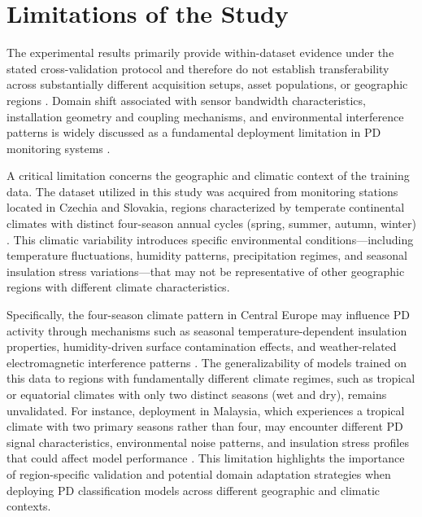 \section{Limitations of the Study}

The experimental results primarily provide within-dataset evidence under the stated cross-validation protocol and therefore do not establish transferability across substantially different acquisition setups, asset populations, or geographic regions \parencite{Raymond_2022, Seitz_2024_1}. Domain shift associated with sensor bandwidth characteristics, installation geometry and coupling mechanisms, and environmental interference patterns is widely discussed as a fundamental deployment limitation in PD monitoring systems \parencite{Friebe_2024, Sikorski_2025}.

A critical limitation concerns the geographic and climatic context of the training data. The dataset utilized in this study was acquired from monitoring stations located in Czechia and Slovakia, regions characterized by temperate continental climates with distinct four-season annual cycles (spring, summer, autumn, winter) \parencite{Florkowski_2024, Sikorski_2025}. This climatic variability introduces specific environmental conditions—including temperature fluctuations, humidity patterns, precipitation regimes, and seasonal insulation stress variations—that may not be representative of other geographic regions with different climate characteristics.

Specifically, the four-season climate pattern in Central Europe may influence PD activity through mechanisms such as seasonal temperature-dependent insulation properties, humidity-driven surface contamination effects, and weather-related electromagnetic interference patterns \parencite{Orellana_2023_1, Florkowski_2024}. The generalizability of models trained on this data to regions with fundamentally different climate regimes, such as tropical or equatorial climates with only two distinct seasons (wet and dry), remains unvalidated. For instance, deployment in Malaysia, which experiences a tropical climate with two primary seasons rather than four, may encounter different PD signal characteristics, environmental noise patterns, and insulation stress profiles that could affect model performance \parencite{Raymond_2022, Azam_2024}. This limitation highlights the importance of region-specific validation and potential domain adaptation strategies when deploying PD classification models across different geographic and climatic contexts.

